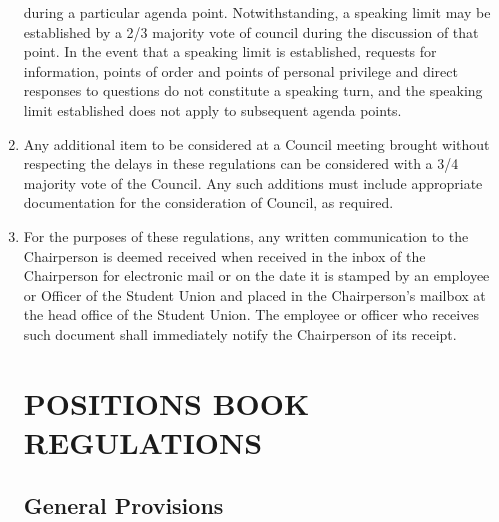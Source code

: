 \documentclass[oneside]{book}
\begin{document}
\begin{enumerate}
during a particular agenda point. Notwithstanding, a speaking limit
may be established by a 2/3 majority vote of council during the discussion
of that point. In the event that a speaking limit is established,
requests for information, points of order and points of personal privilege
and direct responses to questions do not constitute a speaking turn,
and the speaking limit established does not apply to subsequent agenda
points. 
\item Any additional item to be considered at a Council meeting brought
without respecting the delays in these regulations can be considered
with a 3/4 majority vote of the Council. Any such additions must include 
appropriate documentation for the consideration of Council, as required.
\item For the purposes of these regulations, any written communication to
the Chairperson is deemed received when received in the inbox of the
Chairperson for electronic mail or on the date it is stamped by an
employee or Officer of the Student Union and placed in the Chairperson's
mailbox at the head office of the Student Union. The employee or officer
who receives such document shall immediately notify the Chairperson
of its receipt. 


\part{\label{POSITIONS_BOOK_REGULATIONS}POSITIONS BOOK REGULATIONS}

\chapter{\label{POSITIONS_GENERAL_PROVISIONS}General Provisions }



\end{enumerate}
\end{document}
